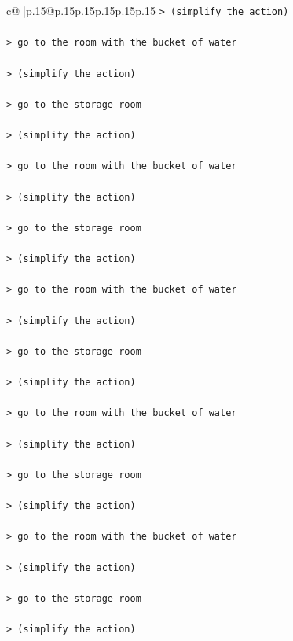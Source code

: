 \documentclass{article}
\begin{document}
{\begin{supertabular}{c@{$\;$}|p{.15\linewidth}@{}p{.15\linewidth}p{.15\linewidth}p{.15\linewidth}p{.15\linewidth}p{.15\linewidth}}
{{{\texttt{> (simplify the action) } \\
\\ 
\texttt{> go to the room with the bucket of water } \\
\\ 
\texttt{> (simplify the action) } \\
\\ 
\texttt{> go to the storage room } \\
\\ 
\texttt{> (simplify the action) } \\
\\ 
\texttt{> go to the room with the bucket of water } \\
\\ 
\texttt{> (simplify the action) } \\
\\ 
\texttt{> go to the storage room } \\
\\ 
\texttt{> (simplify the action) } \\
\\ 
\texttt{> go to the room with the bucket of water } \\
\\ 
\texttt{> (simplify the action) } \\
\\ 
\texttt{> go to the storage room } \\
\\ 
\texttt{> (simplify the action) } \\
\\ 
\texttt{> go to the room with the bucket of water } \\
\\ 
\texttt{> (simplify the action) } \\
\\ 
\texttt{> go to the storage room } \\
\\ 
\texttt{> (simplify the action) } \\
\\ 
\texttt{> go to the room with the bucket of water } \\
\\ 
\texttt{> (simplify the action) } \\
\\ 
\texttt{> go to the storage room } \\
\\ 
\texttt{> (simplify the action) } \\
\\ 
}}}
\end{supertabular}}
\end{document}
